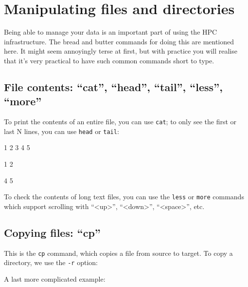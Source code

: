 \chapter{Manipulating files and directories}

Being able to manage your data is an important part of using the HPC
infrastructure.  The bread and butter commands for doing this are mentioned
here.  It might seem annoyingly terse at first, but with practice you will
realise that it's very practical to have such common commands short to type.

\section{File contents: ``cat'', ``head'', ``tail'', ``less'', ``more''}

To print the contents of an entire file, you can use \lstinline|cat|; to only see the
first or last N lines, you can use \lstinline|head| or \lstinline|tail|:

\begin{prompt}
1
2
3
4
5

1
2

4
5
\end{prompt}

To check the contents of long text files, you can use the \lstinline|less| or \lstinline|more|
commands which support scrolling with ``<up>'', ``<down>'', ``<space>'', etc.

\section{Copying files: ``cp''}

\begin{prompt}
\end{prompt}

This is the \lstinline|cp| command, which copies a file from source to target. To copy a directory, we use the \lstinline|-r| option:

\begin{prompt}
\end{prompt}

A last more complicated example:

\begin{prompt}
\end{prompt}

